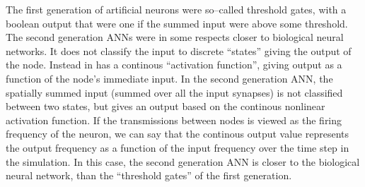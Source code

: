 The first generation of artificial neurons were so--called threshold gates, with a boolean output that were one if the summed input were above some threshold.
The second generation ANNs were in some respects closer to biological neural networks.%
It does not classify the input to discrete ``states'' giving the output of the node. 
Instead in has a continous ``activation function'', giving output as a function of the node's immediate input.
%
In the second generation ANN, the spatially summed input (summed over all the input synapses) is not classified between two states, but gives an output based on the continous nonlinear activation function.
If the transmissions between nodes is viewed as the firing frequency of the neuron, we can say that the continous output value represents the output frequency as a function of the input frequency over the time step in the simulation.
In this case, the second generation ANN is closer to the biological neural network, than the ``threshold gates'' of the first generation. %


